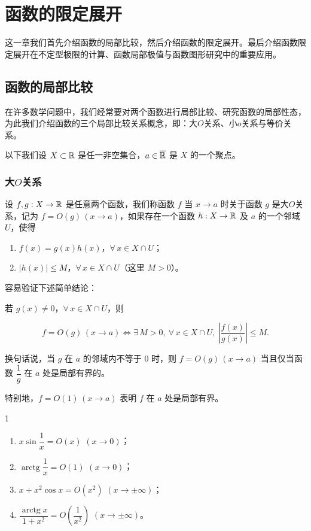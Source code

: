 \chapter{函数的限定展开}

这一章我们首先介绍函数的局部比较，然后介绍函数的限定展开。最后介绍函数限定展开在不定型极限的计算、函数局部极值与函数图形研究中的重要应用。

\section{函数的局部比较}

在许多数学问题中，我们经常要对两个函数进行局部比较、研究函数的局部性态，为此我们介绍函数的三个局部比较关系概念，即：大$O$关系、小$o$关系与等价关系。

以下我们设 $X\subset\mathbb{R}$ 是任一非空集合，$a\in\overline{\mathbb{R}}$ 是 $X$ 的一个聚点。

\subsection{大$O$关系}
	\label{sec:8-1-1}

\begin{mydef*}{}

设 $f,g:X\to\mathbb{R}$ 是任意两个函数，我们称函数 $f$ 当 $x\to a$ 时关于函数 $g$ 是大$O$关系，记为 $f=O(g)\,(x\to a)$，如果存在一个函数 $h:X\to\mathbb{R}$ 及 $a$ 的一个邻域 $U$，使得

\begin{enumerate}[label=\arabic{enumi})]
\item $f(x)=g(x)h(x)$，$\forall\,x\in X\cap U$；
\item $|h(x)|\leqslant M$，$\forall\,x\in X\cap U$（这里 $M>0$）。
\end{enumerate}

\end{mydef*}

容易验证下述简单结论：

若 $g(x)\neq0$，$\forall\,x\in X\cap U$，则

\[f=O(g)\,(x\to a)\Longleftrightarrow\exists\,M>0,\ \forall\,x\in X\cap U,\ \left|\frac{f(x)}{g(x)}\right|\leqslant M.\]

换句话说，当 $g$ 在 $a$ 的邻域内不等于 $0$ 时，则 $f=O(g)\,(x\to a)$ 当且仅当函数 $\dfrac{1}{g}$ 在 $a$ 处是局部有界的。

特别地，$f=O(1)\,(x\to a)$ 表明 $f$ 在 $a$ 处是局部有界。

\begin{sourceexample}{1}

\begin{enumerate}[label=\arabic{enumi})]
\item $x\sin\dfrac{1}{x}=O(x)$ $(x\to0)$；
\item $\operatorname{arctg}\dfrac{1}{x}=O(1)$ $(x\to0)$；
\item $x+x^2\cos x=O(x^2)$ $(x\to\pm\infty)$；
\item $\dfrac{\operatorname{arctg}x}{1+x^2}=O\left(\dfrac{1}{x^2}\right)$ $(x\to\pm\infty)$。
\end{enumerate}

\end{sourceexample}

